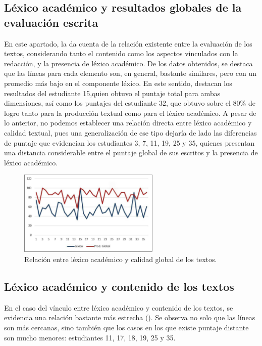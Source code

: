 \documentclass{textolivre-html}
\begin{document}
\subsection{Léxico académico y resultados globales de la evaluación escrita}\label{sec-lex-aca-res}
En este apartado, la  da cuenta de la relación existente entre la
evaluación de los textos, considerando tanto el contenido como los aspectos
vinculados con la redacción, y la presencia de léxico académico. De los datos
obtenidos, se destaca que las líneas para cada elemento son, en general,
bastante similares, pero con un promedio más bajo en el componente léxico. En
este sentido, destacan los resultados del estudiante 15,quien obtuvo el puntaje
total para ambas dimensiones, así como los puntajes del estudiante 32, que
obtuvo sobre el 80\% de logro tanto para la producción textual como para el
léxico académico. A pesar de lo anterior, no podemos establecer una
relación directa entre léxico académico y calidad textual, pues una
generalización de ese tipo dejaría de lado las diferencias de puntaje que
evidencian los estudiantes 3, 7, 11, 19, 25 y 35, quienes presentan una
distancia considerable entre el puntaje global de sus escritos y la presencia de
léxico académico.

\begin{figure}[htbp]
 \centering
 \includegraphics[width=0.6\textwidth]{figure02.pdf}
 \caption{Relación entre léxico académico y calidad global de los textos.}
 \label{fig02}
\end{figure}


\subsection{Léxico académico y contenido de los textos}\label{sec-contenido}
En el caso del vínculo entre léxico académico y contenido de los textos,
se evidencia una relación bastante más estrecha (). Se observa no solo
que las líneas son más cercanas, sino también que los casos en los que existe
puntaje distante son mucho menores: estudiantes 11, 17, 18, 19, 25 y 35.
\end{document}
